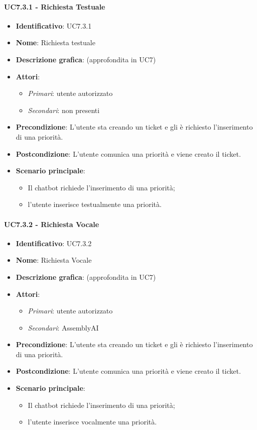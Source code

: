 \paragraph{UC7.3.1 - Richiesta Testuale}
\begin{itemize}
   \item \textbf{Identificativo}: UC7.3.1
   \item \textbf{Nome}: Richiesta testuale
   \item \textbf{Descrizione grafica}: (approfondita in UC7)
   \item \textbf{Attori}:
   \begin{itemize} 
       \item \textit{Primari}: utente autorizzato
       \item \textit{Secondari}: non presenti
   \end{itemize}
       \item \textbf{Precondizione}: L'utente sta creando un ticket e gli è richiesto l'inserimento di una priorità.
       \item \textbf{Postcondizione}: L'utente comunica una priorità e viene creato il ticket. 
    \item \textbf{Scenario principale}: 
       \begin{itemize}
           \item Il chatbot richiede l'inserimento di una priorità;
           \item l'utente inserisce testualmente una priorità.
       \end{itemize}
\end{itemize}

\paragraph{UC7.3.2 - Richiesta Vocale}
\begin{itemize}
   \item \textbf{Identificativo}: UC7.3.2
   \item \textbf{Nome}: Richiesta Vocale
   \item \textbf{Descrizione grafica}: (approfondita in UC7)
   \item \textbf{Attori}:
   \begin{itemize} 
       \item \textit{Primari}: utente autorizzato
       \item \textit{Secondari}: AssemblyAI
   \end{itemize}
   \item \textbf{Precondizione}: L'utente sta creando un ticket e gli è richiesto l'inserimento di una priorità.
   \item \textbf{Postcondizione}: L'utente comunica una priorità e viene creato il ticket. 
    \item \textbf{Scenario principale}: 
       \begin{itemize}  
        \item Il chatbot richiede l'inserimento di una priorità;
        \item l'utente inserisce vocalmente una priorità.
       \end{itemize}
\end{itemize}

